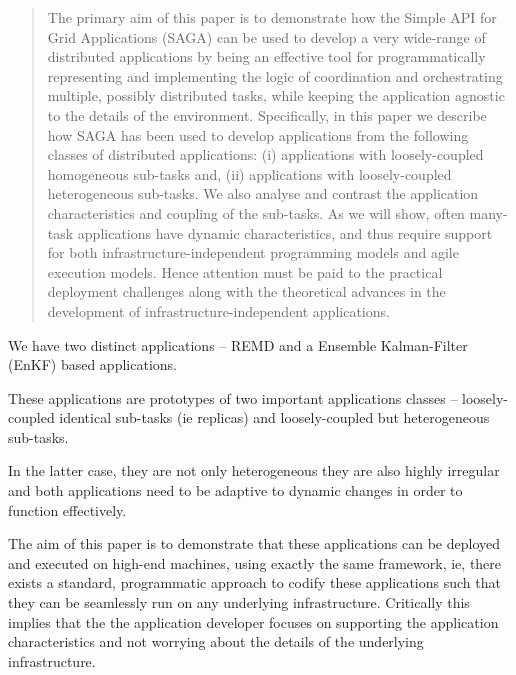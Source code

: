 \documentclass[conference,final]{IEEEtran}
\newcommand{\up}{\vspace*{-1em}}
\begin{document}
\begin{abstract}
  The primary aim of this paper is to demonstrate how the Simple API
  for Grid Applications (SAGA) can be used to develop a very
  wide-range of distributed applications by being an effective tool
  for programmatically representing and implementing the logic of
  coordination and orchestrating multiple, possibly distributed tasks,
  while keeping the application agnostic to the details of the
  environment.  Specifically, in this paper we describe how SAGA has
  been used to develop applications from the following classes of
  distributed applications: (i) applications with loosely-coupled
  homogeneous sub-tasks and, (ii) applications with loosely-coupled
  heterogeneous sub-tasks. We also analyse and contrast the application
  characteristics and coupling of the sub-tasks.  As we will show,
  often many-task applications have dynamic characteristics, and thus
  require support for both infrastructure-independent programming
  models and agile execution models. Hence attention must be paid to
  the practical deployment challenges along with the theoretical
  advances in the development of infrastructure-independent
  applications.
\end{abstract}

\up



We have two distinct applications -- REMD and a Ensemble Kalman-Filter
(EnKF) based applications.

These applications are prototypes of two important applications
classes -- loosely-coupled identical sub-tasks (ie replicas) and
loosely-coupled but heterogeneous sub-tasks.

In the latter case, they are not only heterogeneous they are also
highly irregular and both applications need to be adaptive to dynamic
changes in order to function effectively.


The aim of this paper is to demonstrate that these applications can be
deployed and executed on high-end machines, using exactly the same
framework, ie, there exists a standard, programmatic approach to
codify these applications such that they can be seamlessly run on any
underlying infrastructure. Critically this implies that the the
application developer focuses on supporting the application
characteristics and not worrying about the details of the underlying
infrastructure.
\end{document}
